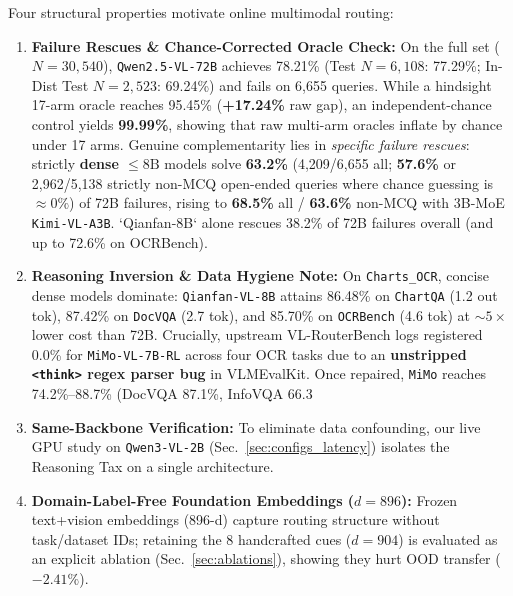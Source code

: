 \documentclass[10pt,twocolumn,letterpaper]{article}
\begin{document}
Four structural properties motivate online multimodal routing:
\begin{enumerate}
    \item \textbf{Failure Rescues \& Chance-Corrected Oracle Check:} On the full set ($N{=}30{,}540$), \texttt{Qwen2.5-VL-72B} achieves 78.21\% (Test $N{=}6{,}108$: 77.29\%; In-Dist Test $N{=}2{,}523$: 69.24\%) and fails on 6,655 queries. While a hindsight 17-arm oracle reaches 95.45\% (\textbf{+17.24\%} raw gap), an independent-chance control yields \textbf{99.99\%}, showing that raw multi-arm oracles inflate by chance under 17 arms. Genuine complementarity lies in \emph{specific failure rescues}: strictly \textbf{dense $\le 8\text{B}$} models solve \textbf{63.2\%} (4,209/6,655 all; \textbf{57.6\%} or 2,962/5,138 strictly non-MCQ open-ended queries where chance guessing is $\approx 0\%$) of 72B failures, rising to \textbf{68.5\%} all / \textbf{63.6\%} non-MCQ with 3B-MoE \texttt{Kimi-VL-A3B}. `Qianfan-8B` alone rescues 38.2\% of 72B failures overall (and up to 72.6\% on OCRBench).
    \item \textbf{Reasoning Inversion \& Data Hygiene Note:} On \texttt{Charts\_OCR}, concise dense models dominate: \texttt{Qianfan-VL-8B} attains 86.48\% on \texttt{ChartQA} (1.2 out tok), 87.42\% on \texttt{DocVQA} (2.7 tok), and 85.70\% on \texttt{OCRBench} (4.6 tok) at $\sim 5\times$ lower cost than 72B. Crucially, upstream VL-RouterBench logs registered 0.0\% for \texttt{MiMo-VL-7B-RL} across four OCR tasks due to an \textbf{unstripped \texttt{<think>} regex parser bug} in VLMEvalKit. Once repaired, \texttt{MiMo} reaches 74.2\%--88.7\% (DocVQA 87.1\%, InfoVQA 66.3%
    \item \textbf{Same-Backbone Verification:} To eliminate data confounding, our live GPU study on \texttt{Qwen3-VL-2B} (Sec.~\ref{sec:configs_latency}) isolates the Reasoning Tax on a single architecture.
    \item \textbf{Domain-Label-Free Foundation Embeddings ($d{=}896$):} Frozen text+vision embeddings (896-d) capture routing structure without task/dataset IDs; retaining the 8 handcrafted cues ($d{=}904$) is evaluated as an explicit ablation (Sec.~\ref{sec:ablations}), showing they hurt OOD transfer ($-2.41\%$).
\end{enumerate}
\end{document}
